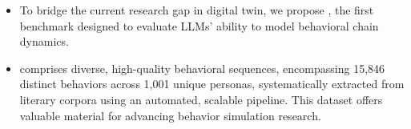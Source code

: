 \begin{itemize}
    \item To bridge the current research gap in digital twin, we propose \datasetname, the first benchmark designed to evaluate LLMs' ability to model behavioral chain dynamics. 



    \item 
\datasetname comprises diverse, high-quality behavioral sequences, encompassing 15,846 distinct behaviors across 1,001 unique personas, systematically extracted from literary corpora using an automated, scalable pipeline. 
This dataset offers valuable material for advancing behavior simulation research.

    





   

\end{itemize}
